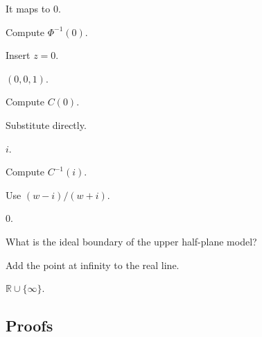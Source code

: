 \begin{solution}
It maps to \(0\).
\end{solution}

\begin{exercise}\label{exr:vii31-ped-02}
Compute \(\Phi^{-1}(0)\).
\end{exercise}

\begin{hint}
Insert \(z=0\).
\end{hint}

\begin{solution}
\((0,0,1)\).
\end{solution}

\begin{exercise}\label{exr:vii31-ped-03}
Compute \(C(0)\).
\end{exercise}

\begin{hint}
Substitute directly.
\end{hint}

\begin{solution}
\(i\).
\end{solution}

\begin{exercise}\label{exr:vii31-ped-04}
Compute \(C^{-1}(i)\).
\end{exercise}

\begin{hint}
Use \((w-i)/(w+i)\).
\end{hint}

\begin{solution}
\(0\).
\end{solution}

\begin{exercise}\label{exr:vii31-ped-05}
What is the ideal boundary of the upper half-plane model?
\end{exercise}

\begin{hint}
Add the point at infinity to the real line.
\end{hint}

\begin{solution}
\(\mathbb R\cup\{\infty\}\).
\end{solution}

\subsection*{Proofs}

